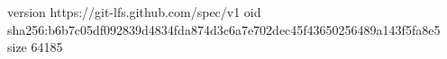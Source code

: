 version https://git-lfs.github.com/spec/v1
oid sha256:b6b7c05df092839d4834fda874d3c6a7e702dec45f43650256489a143f5fa8e5
size 64185
